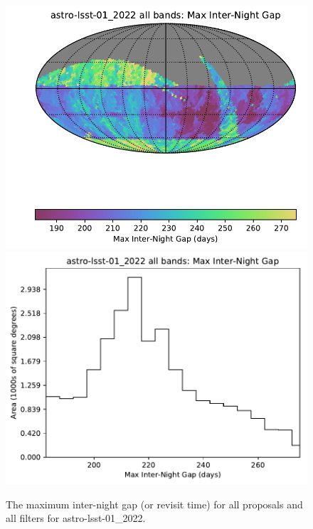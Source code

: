 \documentclass[DM,lsstdraft,authoryear,toc]{lsstdoc}
\begin{document}
\begin{figure}[t!]
\vskip -0.0in
\includegraphics[angle=0,width=0.49\hsize,clip]{figures/astro-lsst-01_2022_Max_Inter-Night_Gap_all_bands_HEAL_SkyMap.pdf}
\includegraphics[angle=0,width=0.49\hsize,clip]{figures/astro-lsst-01_2022_Max_Inter-Night_Gap_all_bands_HEAL_Histogram.pdf}
\vskip -0.1in
\caption{The maximum inter-night gap (or revisit time) for all proposals and all filters for astro-lsst-01\_2022.}
\label{fig:baseline_MAXGapAll}
\end{figure}




\end{document}
